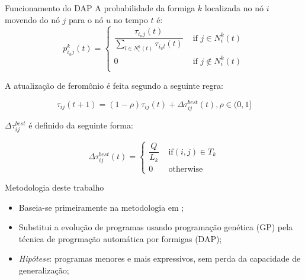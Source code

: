 \documentclass{beamer}
\begin{document}
  \begin{frame}{Funcionamento do DAP}
      A probabilidade da formiga $k$ localizada no nó $i$ movendo do nó $j$ para o nó $u$ no tempo $t$ é:
      \begin{equation}
          \label{eq:pkijt}
          p^k_{i_uj}(t) = \begin{cases}
              \dfrac{\tau_{i_uj}(t)}{\sum_{l\in N^k_i(t)}\tau_{i_ul}(t)} & \text{ if } j \in N^k_i(t) \\
              0 & \text{ if } j \notin N^k_i(t) \\
          \end{cases}
      \end{equation}

      A atualização de feromônio é feita segundo a seguinte regra:

      \begin{equation}
          \label{eq:atualizacao-feromonio}
          \tau_{ij}(t+1) = (1-\rho)\tau_{ij}(t) + \Delta\tau^{best}_{ij}(t), \rho \in (0,1]
      \end{equation}

      $\Delta\tau^{best}_{ij}$ é definido da seguinte forma:

      \begin{equation}
          \label{eq:delta-t}
          \Delta\tau^{best}_{ij}(t) = \begin{cases}
              \dfrac{Q}{L_k} & \text{ if} (i,j) \in T_k \\
              0 & \text{ otherwise}
          \end{cases}
      \end{equation}
  \end{frame}

  \begin{frame}{Metodologia deste trabalho}
      \begin{itemize}
          \item Baseia-se primeiramente na metodologia em \cite{geneticrl};
          \item Substitui a evolução de programas usando programação genética (GP) pela técnica de progrmação automática por formigas (DAP);
          \item \textit{Hipótese}: programas menores e mais expressivos, sem perda da capacidade de generalização;
      \end{itemize}
  \end{frame}
\end{document}
